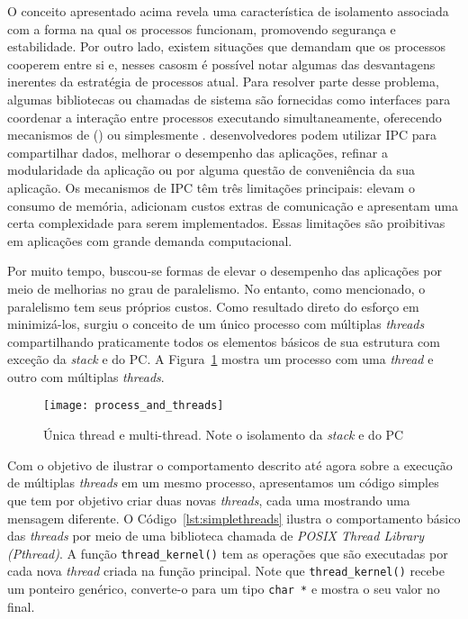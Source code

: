 O conceito apresentado acima revela uma característica de isolamento associada
com a forma na qual os processos funcionam, promovendo segurança e estabilidade.
Por outro
lado, existem situações que demandam que os processos cooperem entre si e,
nesses casosm é possível notar algumas das desvantagens inerentes da estratégia
de processos atual. Para resolver parte desse problema, algumas bibliotecas ou
chamadas de sistema são fornecidas como interfaces para coordenar a
interação entre processos executando simultaneamente, oferecendo mecanismos
de  () ou simplesmente .  desenvolvedores podem utilizar IPC para
compartilhar dados, melhorar o desempenho das aplicações, refinar a
modularidade da aplicação ou por alguma questão de conveniência da sua
aplicação. Os mecanismos de IPC têm três limitações principais: elevam o consumo de memória,
adicionam custos extras de comunicação e apresentam uma certa complexidade para
serem implementados. Essas limitações são proibitivas em aplicações com grande
demanda computacional.

Por muito tempo, buscou-se formas de elevar o desempenho das
aplicações por meio de melhorias no grau de paralelismo. No entanto, como
mencionado, o paralelismo tem seus próprios custos. Como resultado direto
do esforço em minimizá-los,
surgiu o conceito de um único processo com múltiplas \emph{threads}
compartilhando praticamente todos os elementos básicos de sua estrutura com exceção da
\emph{stack} e do PC. A Figura~\ref{fig:single_thread_multi_thread} mostra um
processo com uma \emph{thread} e outro com múltiplas \emph{threads}.

\begin{figure}[!h]
  \centering
  \texttt{[image: process\_and\_threads]}
	\caption[Única thread e multi-thread.]{Única thread e multi-thread. Note o isolamento da \emph{stack} e do PC~\citep{silberschatz}}
  \label{fig:single_thread_multi_thread}
\end{figure}

Com o objetivo de ilustrar o comportamento descrito até agora sobre a execução
de múltiplas \emph{threads} em um mesmo processo, apresentamos um código
simples que tem por objetivo criar duas novas \emph{threads}, cada uma mostrando
uma mensagem diferente. O Código~\ref{lst:simplethreads} ilustra o
comportamento básico das \emph{threads} por meio de uma biblioteca chamada de
\emph{POSIX Thread Library (Pthread)}. A função
\texttt{thread\_kernel()} tem as operações que são executadas por cada nova
\emph{thread} criada na função principal. Note que \texttt{thread\_kernel()}
recebe um ponteiro genérico, converte-o para um tipo \texttt{char *} e
mostra o seu valor no final.

